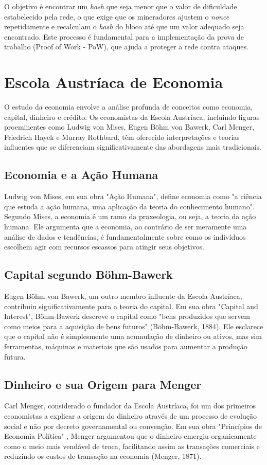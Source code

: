 O objetivo é encontrar um \textit{hash} que seja menor que o valor de dificuldade estabelecido pela rede, o que exige que os mineradores ajustem o \textit{nonce} repetidamente e recalculam o \textit{hash} do bloco até que um valor adequado seja encontrado. Este processo é fundamental para a implementação da prova de trabalho (Proof of Work - PoW), que ajuda a proteger a rede contra ataques.

\clearpage
\section{Escola Austríaca de Economia} \label{sec:austiaca}
O estudo da economia envolve a análise profunda de conceitos como economia, capital, dinheiro e crédito. Os economistas da Escola Austríaca, incluindo figuras proeminentes como Ludwig von Mises, Eugen Böhm von Bawerk, Carl Menger, Friedrich Hayek e Murray Rothbard, têm oferecido interpretações e teorias influentes que se diferenciam significativamente das abordagens mais tradicionais. 

\subsection{Economia e a Ação Humana}
Ludwig von Mises, em sua obra "Ação Humana"\cite{von2023accao}, define economia como "a ciência que estuda a ação humana, uma aplicação da teoria do conhecimento humano". Segundo Mises, a economia é um ramo da praxeologia, ou seja, a teoria da ação humana. Ele argumenta que a economia, ao contrário de ser meramente uma análise de dados e tendências, é fundamentalmente sobre como os indivíduos escolhem agir com recursos escassos para atingir seus objetivos.

\subsection{Capital segundo Böhm-Bawerk}
Eugen Böhm von Bawerk, um outro membro influente da Escola Austríaca, contribuiu significativamente para a teoria do capital. Em sua obra "Capital and Interest"\cite{von1922capital}, Böhm-Bawerk descreve o capital como "bens produzidos que servem como meios para a aquisição de bens futuros" (Böhm-Bawerk, 1884). Ele esclarece que o capital não é simplesmente uma acumulação de dinheiro ou ativos, mas sim ferramentas, máquinas e materiais que são usados para aumentar a produção futura.

\subsection{Dinheiro e sua Origem para Menger}
Carl Menger, considerado o fundador da Escola Austríaca, foi um dos primeiros economistas a explicar a origem do dinheiro através de um processo de evolução social e não por decreto governamental ou convenção. Em sua obra "Princípios de Economia Política" \cite{menger2017liberalismo}, Menger argumentou que o dinheiro emergiu organicamente como o meio mais vendável de troca, facilitando assim as transações comerciais e reduzindo os custos de transação na economia (Menger, 1871).


